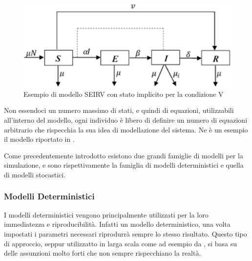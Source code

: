 
\begin{figure}[h]
    \begin{center}
        \includegraphics[width=\linewidth]{img/seirv_implicit.jpg}
        \caption{Esempio di modello SEIRV con stato implicito per la condizione V}
        \label{fig:SEIRV_implicito}
    \end{center}
\end{figure}

Non essendoci un numero massimo di stati, e quindi di equazioni, utilizzabili
all'interno del modello, ogni individuo è libero di definire un numero
di equazioni arbitrario che rispecchia la sua idea di modellazione del 
sistema. Ne è un esempio il modello riportato in \cite{Giordano2020}.

Come precedentemente introdotto esistono due grandi famiglie di modelli
per la simulazione, e sono rispettivamente la famiglia di modelli deterministici
e quella di modelli stocastici.

\subsubsection{Modelli Deterministici}
I modelli deterministici vengono principalmente utilizzati 
per la loro immediatezza e riproducibilità. Infatti un modello
deterministico, una volta impostati i parametri necessari
riprodurrà sempre lo stesso risultato. Questo tipo di approccio, 
seppur utilizzatto in larga scala come ad esempio da \cite{Bjornstad2020}
\cite{Mwalili2020}, \cite{Giordano2020} si basa su delle assunzioni molto forti
che non sempre rispecchiano la realtà. 

